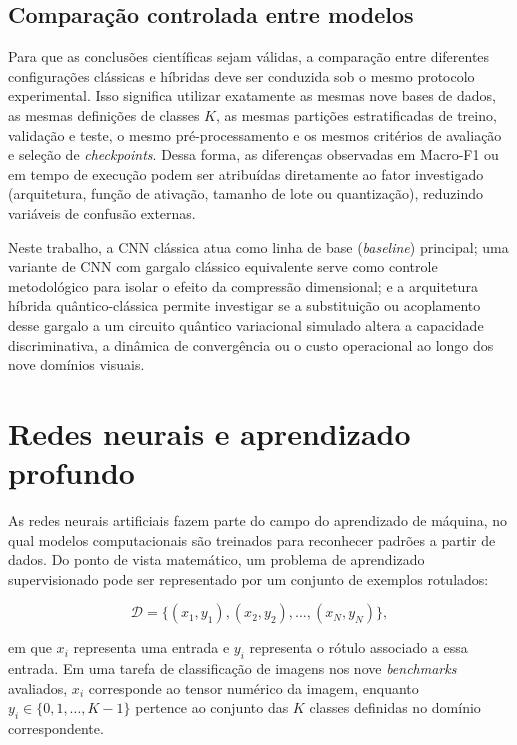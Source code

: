 \documentclass[
    12pt,
    openright,
    oneside,
    a4paper,
    english,
    brazil
]{abntex2}
\begin{document}
\subsection{Comparação controlada entre modelos}
\label{subsec:comparacao_controlada_modelos}

Para que as conclusões científicas sejam válidas, a comparação entre diferentes configurações clássicas e híbridas deve ser conduzida sob o mesmo protocolo experimental. Isso significa utilizar exatamente as mesmas nove bases de dados, as mesmas definições de classes \(K\), as mesmas partições estratificadas de treino, validação e teste, o mesmo pré-processamento e os mesmos critérios de avaliação e seleção de \textit{checkpoints}. Dessa forma, as diferenças observadas em Macro-F1 ou em tempo de execução podem ser atribuídas diretamente ao fator investigado (arquitetura, função de ativação, tamanho de lote ou quantização), reduzindo variáveis de confusão externas.

Neste trabalho, a CNN clássica atua como linha de base (\textit{baseline}) principal; uma variante de CNN com gargalo clássico equivalente serve como controle metodológico para isolar o efeito da compressão dimensional; e a arquitetura híbrida quântico-clássica permite investigar se a substituição ou acoplamento desse gargalo a um circuito quântico variacional simulado altera a capacidade discriminativa, a dinâmica de convergência ou o custo operacional ao longo dos nove domínios visuais.

\section{Redes neurais e aprendizado profundo}

As redes neurais artificiais fazem parte do campo do aprendizado de máquina, no qual modelos computacionais são treinados para reconhecer padrões a partir de dados. Do ponto de vista matemático, um problema de aprendizado supervisionado pode ser representado por um conjunto de exemplos rotulados:

\[
\mathcal{D} = \{(x_1,y_1),(x_2,y_2),\ldots,(x_N,y_N)\},
\]

em que \(x_i\) representa uma entrada e \(y_i\) representa o rótulo associado a essa entrada. Em uma tarefa de classificação de imagens nos nove \textit{benchmarks} avaliados, \(x_i\) corresponde ao tensor numérico da imagem, enquanto \(y_i \in \{0, 1, \dots, K-1\}\) pertence ao conjunto das \(K\) classes definidas no domínio correspondente.
\end{document}
